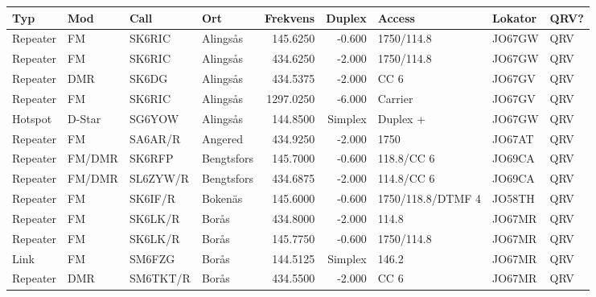 \begin{landscape}
\begin{longtable}{llllrrlll}
	\bf Typ           & \bf Mod         & \bf Call & \bf Ort               & \bf Frekvens & \bf Duplex & \bf Access        & \bf Lokator & \bf QRV? \\ \hline
	\endhead
Repeater & FM              & SK6RIC   & Alingsås              &     145.6250 &     -0.600 & 1750/114.8        & JO67GW      & QRV      \\
	Repeater          & FM              & SK6RIC   & Alingsås              &     434.6250 &     -2.000 & 1750/114.8        & JO67GW      & QRV      \\
	Repeater          & DMR             & SK6DG    & Alingsås              &     434.5375 &     -2.000 & CC 6              & JO67GV      & QRV      \\
	Repeater          & FM              & SK6RIC   & Alingsås              &    1297.0250 &     -6.000 & Carrier           & JO67GV      & QRV      \\
	Hotspot           & D-Star          & SG6YOW   & Alingsås              &     144.8500 &    Simplex & Duplex +          & JO67GW      & QRV      \\
	Repeater          & FM              & SA6AR/R  & Angered               &     434.9250 &     -2.000 & 1750              & JO67AT      & QRV      \\
	Repeater          & FM/DMR          & SK6RFP   & Bengtsfors            &     145.7000 &     -0.600 & 118.8/CC 6        & JO69CA      & QRV      \\
	Repeater          & FM/DMR          & SL6ZYW/R & Bengtsfors            &     434.6875 &     -2.000 & 114.8/CC 6        & JO69CA      & QRV      \\
	Repeater          & FM              & SK6IF/R  & Bokenäs               &     145.6000 &     -0.600 & 1750/118.8/DTMF 4 & JO58TH      & QRV      \\
	Repeater          & FM              & SK6LK/R  & Borås                 &     434.8000 &     -2.000 & 114.8             & JO67MR      & QRV      \\
	Repeater          & FM              & SK6LK/R  & Borås                 &     145.7750 &     -0.600 & 1750/114.8        & JO67MR      & QRV      \\
	Link              & FM              & SM6FZG   & Borås                 &     144.5125 &    Simplex & 146.2             & JO67MR      & QRV      \\
	Repeater          & DMR             & SM6TKT/R & Borås                 &     434.5500 &     -2.000 & CC 6              & JO67MR      & QRV      \\

\end{longtable}
\end{landscape}

